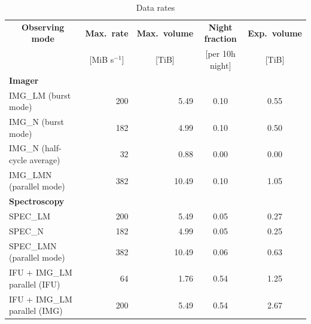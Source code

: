 \begin{table}[ht]
  \centering
  \caption{Data rates}\label{tab:data_rates}
  \begin{tabular}{|l|r|r|c|c|}
    \hline
    \multicolumn{1}{|c|}{\textbf{Observing mode}} & \multicolumn{1}{c|}{\textbf{Max.\ rate}} & \multicolumn{1}{c|}{\textbf{Max.\ volume}} & \multicolumn{1}{c|}{\textbf{Night fraction}} & \multicolumn{1}{c|}{\textbf{Exp.\  volume}} \\
    \multicolumn{1}{|c|}{ }                       & \multicolumn{1}{c|}{[MiB s$^{-1}$]}     & \multicolumn{1}{c|}{[TiB]}                & \multicolumn{1}{c|}{[per 10h night]}         & \multicolumn{1}{c|}{[TiB]}                \\
    \hline\hline
    \textbf{Imager}                               &                                         &                                           &                                              &                                           \\
    IMG\_LM (burst mode)            & 200         & 5.49        & 0.10       & 0.55                                      \\
    IMG\_N (burst mode)             & 182         & 4.99        & 0.10       & 0.50                                      \\
    IMG\_N  (half-cycle average)    & 32          & 0.88        & 0.00       & 0.00                                      \\
    IMG\_LMN  (parallel mode)       & 382         & 10.49       & 0.10       & 1.05                                      \\
    \hline
    \textbf{Spectroscopy}          &                            &                      &                  &                                           \\
    SPEC\_LM                       & 200         & 5.49         & 0.05       & 0.27                       \\
    SPEC\_N                        & 182         & 4.99         & 0.05       & 0.25                       \\
    SPEC\_LMN  (parallel mode)     & 382         & 10.49        & 0.06       & 0.63                                      \\
    IFU + IMG\_LM parallel (IFU)   & 64          & 1.76         & 0.54       & 1.25                       \\
    IFU + IMG\_LM parallel (IMG)   & 200         & 5.49         & 0.54       & 2.67                                      \\
    \hline
  \end{tabular}
\end{table}


